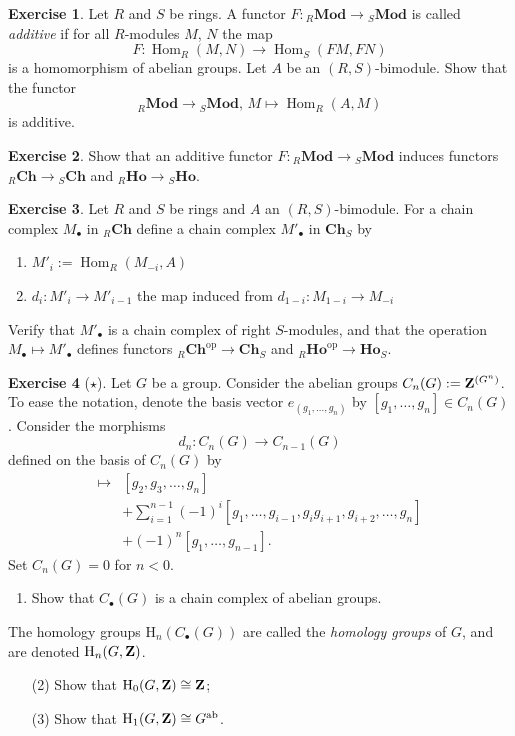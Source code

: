 \documentclass[11pt]{amsbook}
\DeclareMathOperator\Hom{Hom}
\DeclareMathOperator\Mod{{\bf{Mod}}}
\def\rH{{\mathrm H}} \def\rK{{\mathrm K}} \def\rR{{\mathrm R}}
\def\ab{\mathrm{ab}}
\def\opp{\mathrm{op}}
\def\Mod{\mathbf{Mod}}
\def\Ch{\mathbf{Ch}}
\def\Ho{\mathbf{Ho}}
\theoremstyle{plain}
\theoremstyle{definition}
\newtheorem{exercise}{Exercise}
\begin{document}
\begin{exercise}Let $R$ and $S$ be rings. A functor $F\colon {}_R\Mod\to {}_S\Mod$ is
called \emph{additive} if for all $R$-modules $M$, $N$ the map
\[
	F\colon \Hom_R(M,N) \to \Hom_S(FM,FN)
\]
is a homomorphism of abelian groups.  Let $A$ be an $(R,S)$-bimodule. Show that the functor
\[
	{}_R\Mod \to {}_S\Mod,\, M \mapsto \Hom_R(A,M)
\]
is additive.
\end{exercise}

\begin{exercise}
Show that an additive functor $F\colon {}_R\Mod \to {}_S\Mod$ induces functors
${}_R\Ch\to {}_S\Ch$ and ${}_R\Ho\to {}_S\Ho$.
\end{exercise}

\begin{exercise}\label{exc:contravariant-hom-on-chain-complexes}
Let $R$ and $S$ be rings and $A$ an $(R,S)$-bimodule. For a chain complex $M_\bullet$ in ${}_R\Ch$ define a chain complex $M'_\bullet$ in $\Ch_S$
by
\begin{enumerate}
\item $M'_i := \Hom_R(M_{-i},A)$ 
\item $d_i\colon M'_i \to M'_{i-1}$ the map induced from $d_{1-i} \colon M_{1-i} \to M_{-i}$
\end{enumerate}
Verify that $M'_\bullet$ is a chain complex of right $S$-modules, and that the operation $M_\bullet \mapsto M'_\bullet$ defines functors ${}_R\Ch^\opp \to \Ch_S$ and ${}_R\Ho^\opp \to \Ho_S$.
\end{exercise}

\begin{exercise}[$\star$]
Let $G$ be a group. Consider the abelian groups $C_n(G) := {\mathbf{Z}}^{(G^n)}$. To ease the notation, denote the basis vector $e_{(g_1,\ldots,g_n)}$ by $[g_1,\ldots,g_n] \in C_n(G)$. Consider the morphisms
\[
	d_n \colon C_n(G) \to C_{n-1}(G) 
\]
defined on the basis of $C_n(G)$ by
\begin{align*}
	[g_1,\ldots, g_n] \mapsto &[g_2, g_3, \ldots, g_n] \\
	&+ \sum_{i=1}^{n-1} (-1)^i [g_1,\ldots, g_{i-1}, g_i g_{i+1}, g_{i+2}, \ldots, g_n] \\
	& + (-1)^n [ g_1,\ldots, g_{n-1} ].
\end{align*}
Set $C_n(G)=0$ for $n<0$.
\begin{enumerate}
\item Show that $C_\bullet(G)$ is a chain complex of abelian groups.
\end{enumerate}
The homology groups
$\rH_n(C_\bullet(G))$ are called the \emph{homology groups} of $G$, and are denoted $\rH_n(G,\bZ)$.
\begin{enumerate}
\item[(2)] Show that $\rH_0(G,\bZ)\cong \bZ$;
\item[(3)] Show that $\rH_1(G,\bZ)\cong G^\ab$.
\end{enumerate} 
\end{exercise}
\end{document}
